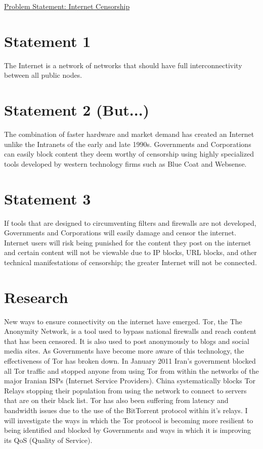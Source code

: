 \documentclass[12pt]{article}
\def\title{Problem Statement: Internet Censorship}
\begin{document}
\underline{
\large{\title}
}

\section{Statement 1}
The Internet is a network of networks that should have full interconnectivity between all public
nodes.

\section{Statement 2 (But...)}
The combination of faster hardware and market demand has created an Internet unlike the Intranets of
the early and late 1990s. Governments and Corporations can easily block content they deem worthy of
censorship using highly specialized tools developed by western technology firms such as Blue Coat
and Websense.

\section{Statement 3}
If tools that are designed to circumventing filters and firewalls are not developed, Governments and
Corporations will easily damage and censor the internet. Internet users will risk being punished for
the content they post on the internet and certain content will not be viewable due to IP blocks, URL
blocks, and other technical manifestations of censorship; the greater Internet will not be connected.

\section{Research}
New ways to ensure connectivity on the internet have emerged. Tor, the The Anonymity Network, is a
tool used to bypass national firewalls and reach content that has been censored. It is also used to post
anonymously to blogs and social media sites. As Governments have become more aware of this technology, the
effectiveness of Tor has broken down. In January 2011 Iran's government blocked all Tor traffic and stopped
anyone from using Tor from within the networks of the major Iranian ISPs (Internet Service
Providers). China systematically blocks Tor Relays stopping their population from using the network
to connect to servers that are on their black list. Tor has also been suffering from latency and
bandwidth issues due to the use of the BitTorrent protocol within it's relays. I will investigate the
ways in which the Tor protocol is becoming more resilient to being identified and blocked by
Governments and ways in which it is improving its QoS (Quality of Service).
\end{document}
